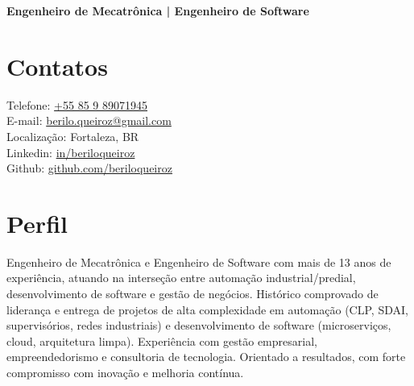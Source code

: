 \documentclass[11pt,a4paper,sans]{moderncv}
\begin{document}
\makecvtitle
\vspace*{-10mm}
\begin{center}\textbf{ Engenheiro de Mecatrônica | Engenheiro de Software}\end{center}

\section{Contatos}
 {
  \begin{samepage}
	  \faMobile\enspace Telefone: {\color{blue}\href{tel:+5585989071945}{+55 85 9 89071945}} \\
	  \faEnvelope\enspace E-mail: {\color{blue}\href{mailto:berilo.queiroz@gmail.com}{berilo.queiroz@gmail.com}} \\
	  \faHome\enspace Localização: Fortaleza, BR \\
	  \faLinkedin\enspace Linkedin: {\color{blue}\href{https://www.linkedin.com/in/beriloqueiroz}{in/beriloqueiroz}}\\
	  \faGithub\enspace Github: {\color{blue} \href{https://github.com/beriloqueiroz}{github.com/beriloqueiroz}}
  \end{samepage}
 }
\section{Perfil}
 {
  Engenheiro de Mecatrônica e Engenheiro de Software com mais de 13 anos de experiência, atuando na
  interseção entre automação industrial/predial, desenvolvimento de software e gestão de negócios.
  Histórico comprovado de liderança e entrega de projetos de alta complexidade em automação (CLP, SDAI,
  supervisórios, redes industriais) e desenvolvimento de software (microserviços, cloud, arquitetura limpa).
  Experiência com gestão empresarial, empreendedorismo e consultoria de tecnologia. Orientado a resultados,
  com forte compromisso com inovação e melhoria contínua.
 }
\end{document}
